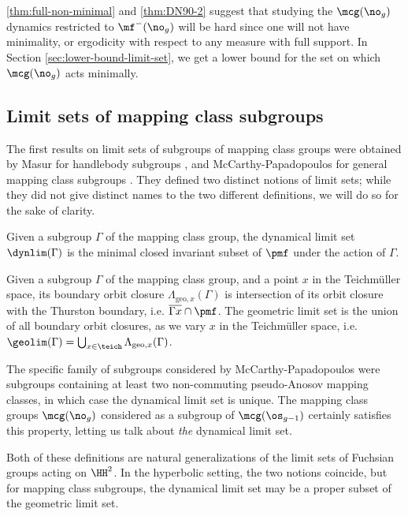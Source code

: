 \documentclass[12pt, reqno]{amsart}
\begin{document}
\autoref{thm:full-non-minimal} and \autoref{thm:DN90-2} suggest that studying the $\mcg(\no_g)$ dynamics restricted to $\mf^{-}(\no_g)$ will be hard since one will not have minimality, or ergodicity with respect to any measure with full support.
In Section \ref{sec:lower-bound-limit-set}, we get a lower bound for the set on which $\mcg(\no_g)$ acts minimally.

\subsection{Limit sets of mapping class subgroups}
\label{sec:backgr-limit-sets}

The first results on limit sets of subgroups of mapping class groups were obtained by Masur for handlebody subgroups \cite{masur_1986}, and McCarthy-Papadopoulos for general mapping class subgroups \cite{McCarthy1989}.
They defined two distinct notions of limit sets; while they did not give distinct names to the two different definitions, we will do so for the sake of clarity.
\begin{definition}
  Given a subgroup $\Gamma$ of the mapping class group, the dynamical limit set $\dynlim(\Gamma)$ is the minimal closed invariant subset of $\pmf$ under the action of $\Gamma$.
\end{definition}
\begin{definition}
  Given a subgroup $\Gamma$ of the mapping class group, and a point $x$ in the Teichmüller space, its boundary orbit closure $\Lambda_{\mathrm{geo}, x}(\Gamma)$ is intersection of its orbit closure with the Thurston boundary, i.e. $\overline{\Gamma x} \cap \pmf$.
  The geometric limit set is the union of all boundary orbit closures, as we vary $x$ in the Teichmüller space, i.e. $\geolim(\Gamma) = \bigcup_{x \in \teich} \Lambda_{\mathrm{geo}, x}(\Gamma)$.
\end{definition}

\begin{remark}
  The specific family of subgroups considered by McCarthy-Papadopoulos were subgroups containing at least two non-commuting pseudo-Anosov mapping classes, in which case the dynamical limit set is unique.
  The mapping class groups $\mcg(\no_{g})$ considered as a subgroup of $\mcg(\os_{g-1})$ certainly satisfies this property, letting us talk about \emph{the} dynamical limit set.
\end{remark}

Both of these definitions are natural generalizations of the limit sets of Fuchsian groups acting on $\HH^2$.
In the hyperbolic setting, the two notions coincide, but for mapping class subgroups, the dynamical limit set may be a proper subset of the geometric limit set.
\end{document}
